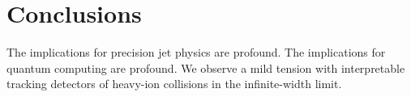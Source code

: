 \section{Conclusions}\label{sec:conclusions}

The implications for precision jet physics are profound. The
implications for quantum computing are profound. We observe a mild
tension with interpretable tracking detectors of heavy-ion collisions in
the infinite-width limit.

